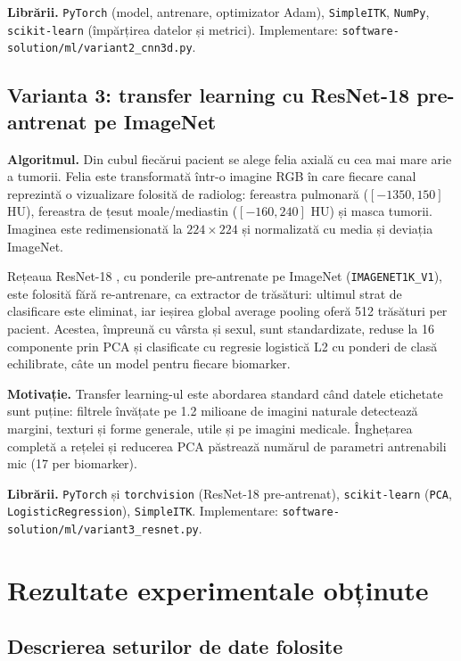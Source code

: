 \documentclass[runningheads,a4paper,11pt]{report}
\begin{document}
\textbf{Librării.} \texttt{PyTorch} (model, antrenare, optimizator Adam), \texttt{SimpleITK}, \texttt{NumPy}, \texttt{scikit-learn} (împărțirea datelor și metrici). Implementare: \nolinkurl{software-solution/ml/variant2_cnn3d.py}.

\section{Varianta 3: transfer learning cu ResNet-18 pre-antrenat pe ImageNet}
\textbf{Algoritmul.} Din cubul fiecărui pacient se alege felia axială cu cea mai mare arie a tumorii. Felia este transformată într-o imagine RGB în care fiecare canal reprezintă o vizualizare folosită de radiolog: fereastra pulmonară ($[-1350, 150]$ HU), fereastra de țesut moale/mediastin ($[-160, 240]$ HU) și masca tumorii. Imaginea este redimensionată la $224 \times 224$ și normalizată cu media și deviația ImageNet.

Rețeaua ResNet-18 \cite{resnet}, cu ponderile pre-antrenate pe ImageNet (\texttt{IMAGENET1K\_V1}), este folosită fără re-antrenare, ca extractor de trăsături: ultimul strat de clasificare este eliminat, iar ieșirea global average pooling oferă 512 trăsături per pacient. Acestea, împreună cu vârsta și sexul, sunt standardizate, reduse la 16 componente prin PCA și clasificate cu regresie logistică L2 cu ponderi de clasă echilibrate, câte un model pentru fiecare biomarker.

\textbf{Motivație.} Transfer learning-ul este abordarea standard când datele etichetate sunt puține: filtrele învățate pe 1.2 milioane de imagini naturale detectează margini, texturi și forme generale, utile și pe imagini medicale. Înghețarea completă a rețelei și reducerea PCA păstrează numărul de parametri antrenabili mic (17 per biomarker).

\textbf{Librării.} \texttt{PyTorch} și \texttt{torchvision} (ResNet-18 pre-antrenat), \texttt{scikit-learn} (\texttt{PCA}, \texttt{LogisticRegression}), \texttt{SimpleITK}. Implementare: \nolinkurl{software-solution/ml/variant3_resnet.py}.


\chapter{Rezultate experimentale obținute}
\label{chapter:rezultate_experimentale}

\section{Descrierea seturilor de date folosite}
\end{document}
